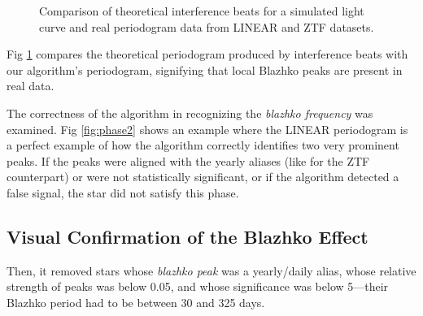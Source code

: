 \begin{figure}
  \centering
       \caption{Comparison of theoretical interference beats for a simulated light curve and real periodogram data from LINEAR and ZTF datasets.}
       \label{fig:periodogram}
  \end{figure}

  Fig \ref{fig:periodogram} compares the theoretical periodogram produced by interference beats with our algorithm's periodogram,
  signifying that local Blazhko peaks are present in real data.


The correctness of the algorithm in recognizing the \textit{blazhko frequency} was examined. Fig \ref{fig:phase2} shows an example where the LINEAR periodogram is a perfect example of how the algorithm correctly identifies two very prominent peaks. If the peaks were aligned with the yearly aliases (like for the ZTF counterpart) or were not statistically significant, or if the algorithm detected a false signal, the star did not satisfy this phase.



\subsection{Visual Confirmation of the Blazhko Effect}


Then, it removed stars whose \textit{blazhko peak} was a yearly/daily alias, whose relative strength of peaks was below 0.05, and whose significance was below 5—their Blazhko period had to be between 30 and 325 days. 

